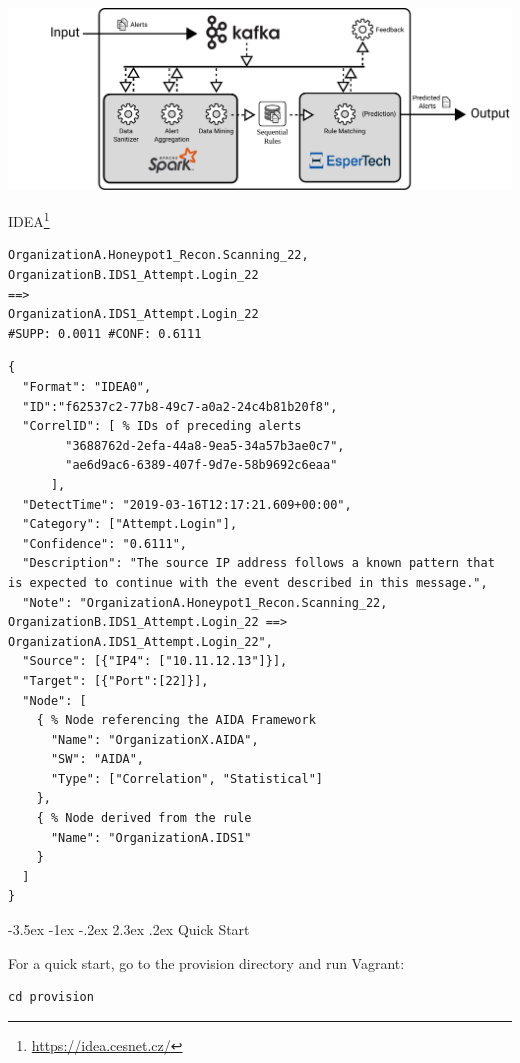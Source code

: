 \documentclass[a4paper]{article} %
\makeatletter
\renewcommand\section{\@startsection {section}{1}{\z@}%
                   {-3.5ex \@plus -1ex \@minus -.2ex}%
                   {2.3ex \@plus.2ex}%
                   {\normalfont\sffamily\Large\bfseries\color{projectcolor}}}
\makeatother
\begin{document}
\includegraphics[width=\textwidth]{fig/aida_schema}

IDEA\footnote{\url{https://idea.cesnet.cz/}}

\begin{lstlisting}[]
OrganizationA.Honeypot1_Recon.Scanning_22,
OrganizationB.IDS1_Attempt.Login_22
==>
OrganizationA.IDS1_Attempt.Login_22
#SUPP: 0.0011 #CONF: 0.6111
\end{lstlisting}

\begin{lstlisting}[]
{
  "Format": "IDEA0",
  "ID":"f62537c2-77b8-49c7-a0a2-24c4b81b20f8",
  "CorrelID": [ % IDs of preceding alerts
        "3688762d-2efa-44a8-9ea5-34a57b3ae0c7",
        "ae6d9ac6-6389-407f-9d7e-58b9692c6eaa"
      ],
  "DetectTime": "2019-03-16T12:17:21.609+00:00",
  "Category": ["Attempt.Login"],
  "Confidence": "0.6111",
  "Description": "The source IP address follows a known pattern that is expected to continue with the event described in this message.",
  "Note": "OrganizationA.Honeypot1_Recon.Scanning_22, OrganizationB.IDS1_Attempt.Login_22 ==> OrganizationA.IDS1_Attempt.Login_22",
  "Source": [{"IP4": ["10.11.12.13"]}],
  "Target": [{"Port":[22]}],
  "Node": [
    { % Node referencing the AIDA Framework
      "Name": "OrganizationX.AIDA",
      "SW": "AIDA",
      "Type": ["Correlation", "Statistical"]
    },
    { % Node derived from the rule
      "Name": "OrganizationA.IDS1"
    }
  ]
}
\end{lstlisting}

\cleardoublepage

\section{Quick Start}

For a quick start, go to the provision directory and run Vagrant:

\begin{lstlisting}[]
cd provision
\end{lstlisting}
\end{document}
